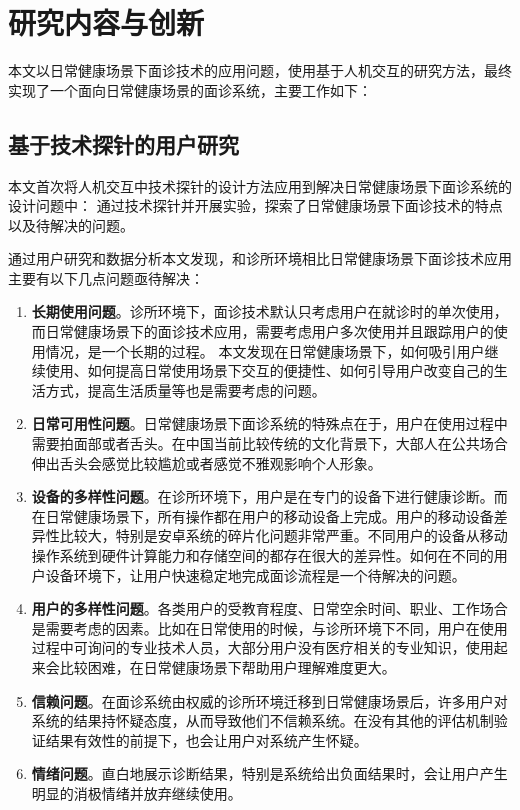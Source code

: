 \section{研究内容与创新}

本文以日常健康场景下面诊技术的应用问题，使用基于人机交互的研究方法，最终实现了一个面向日常健康场景的面诊系统，主要工作如下：

\subsection{基于技术探针的用户研究}

本文首次将人机交互中技术探针的设计方法应用到解决日常健康场景下面诊系统的设计问题中：
通过技术探针并开展实验，探索了日常健康场景下面诊技术的特点以及待解决的问题。

通过用户研究和数据分析本文发现，和诊所环境相比日常健康场景下面诊技术应用主要有以下几点问题亟待解决：
\begin{enumerate}
    \item \textbf{长期使用问题}。诊所环境下，面诊技术默认只考虑用户在就诊时的单次使用，而日常健康场景下的面诊技术应用，需要考虑用户多次使用并且跟踪用户的使用情况，是一个长期的过程。
    本文发现在日常健康场景下，如何吸引用户继续使用、如何提高日常使用场景下交互的便捷性、如何引导用户改变自己的生活方式，提高生活质量等也是需要考虑的问题。
    
    \item \textbf{日常可用性问题}。日常健康场景下面诊系统的特殊点在于，用户在使用过程中需要拍面部或者舌头。在中国当前比较传统的文化背景下，大部人在公共场合伸出舌头会感觉比较尴尬或者感觉不雅观影响个人形象。

    \item \textbf{设备的多样性问题}。在诊所环境下，用户是在专门的设备下进行健康诊断。而在日常健康场景下，所有操作都在用户的移动设备上完成。用户的移动设备差异性比较大，特别是安卓系统的碎片化问题非常严重。不同用户的设备从移动操作系统到硬件计算能力和存储空间的都存在很大的差异性。如何在不同的用户设备环境下，让用户快速稳定地完成面诊流程是一个待解决的问题。
    
    \item \textbf{用户的多样性问题}。各类用户的受教育程度、日常空余时间、职业、工作场合是需要考虑的因素。比如在日常使用的时候，与诊所环境下不同，用户在使用过程中可询问的专业技术人员，大部分用户没有医疗相关的专业知识，使用起来会比较困难，在日常健康场景下帮助用户理解难度更大。
        
    \item \textbf{信赖问题}。在面诊系统由权威的诊所环境迁移到日常健康场景后，许多用户对系统的结果持怀疑态度，从而导致他们不信赖系统。在没有其他的评估机制验证结果有效性的前提下，也会让用户对系统产生怀疑。
    
    \item \textbf{情绪问题}。直白地展示诊断结果，特别是系统给出负面结果时，会让用户产生明显的消极情绪并放弃继续使用。 
\end{enumerate}

